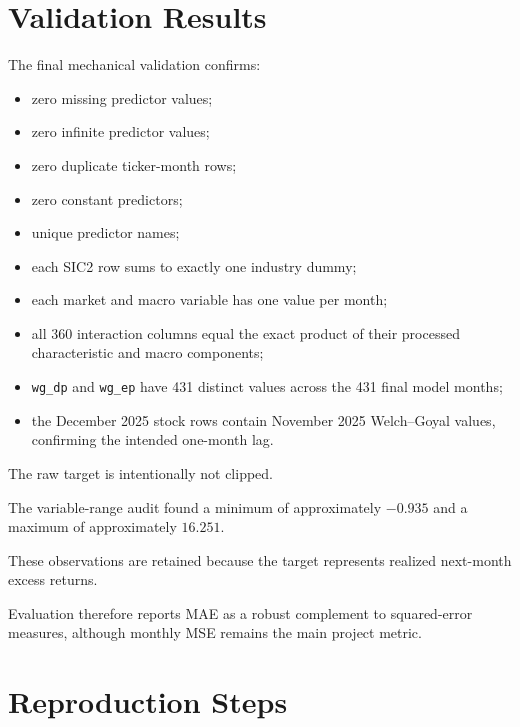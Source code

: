 \documentclass[11pt,a4paper]{article}
\newcommand{\code}[1]{\texttt{#1}}
\begin{document}

\section{Validation Results}

The final mechanical validation confirms:

\begin{itemize}
  \item zero missing predictor values;
  \item zero infinite predictor values;
  \item zero duplicate ticker-month rows;
  \item zero constant predictors;
  \item unique predictor names;
  \item each SIC2 row sums to exactly one industry dummy;
  \item each market and macro variable has one value per month;
  \item all 360 interaction columns equal the exact product of their processed
        characteristic and macro components;
  \item \code{wg\_dp} and \code{wg\_ep} have 431 distinct values across the
        431 final model months;
  \item the December 2025 stock rows contain November 2025 Welch--Goyal values,
        confirming the intended one-month lag.
\end{itemize}

The raw target is intentionally not clipped.

The variable-range audit found a minimum of approximately \(-0.935\) and a
maximum of approximately \(16.251\).

These observations are retained because the target represents realized
next-month excess returns.

Evaluation therefore reports MAE as a robust complement to squared-error
measures, although monthly MSE remains the main project metric.


\section{Reproduction Steps}
\end{document}
